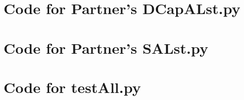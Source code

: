 \documentclass[12pt]{article}
\begin{document}
\noindent 

\newpage

\section{Code for Partner's DCapALst.py}

\noindent 

\newpage

\section{Code for Partner's SALst.py}

\noindent 

\newpage

\section{Code for testAll.py}

\noindent 
\end{document}
